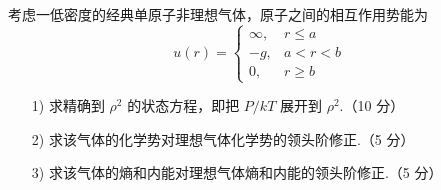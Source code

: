 \documentclass{assignment}
\begin{document}
\begin{prob}
    考虑一低密度的经典单原子非理想气体，原子之间的相互作用势能为
    \[
        u(r)=\left\{\begin{array}{ll}
            \infty,&r\leq a\\
            -g,&a<r<b\\
            0,&r\geq b
        \end{array}\right.
    \]
    \begin{itemize}
        \item[1)] 求精确到 $\rho^2$ 的状态方程，即把 $P/kT$ 展开到 $\rho^2$.（10 分）
        \item[2)] 求该气体的化学势对理想气体化学势的领头阶修正.（5 分）
        \item[3)] 求该气体的熵和内能对理想气体熵和内能的领头阶修正.（5 分）
    \end{itemize}
\end{prob}
\end{document}
